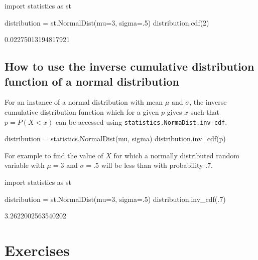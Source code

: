 \begin{pyin}
import statistics as st

distribution = st.NormalDist(mu=3, sigma=.5)
distribution.cdf(2)
\end{pyin}





\begin{raw}
0.02275013194817921
\end{raw}





\subsection{How to use the inverse cumulative distribution function of a normal distribution}
\label{\detokenize{tools-for-mathematics/08-statistics/how/main:how-to-use-the-inverse-cumulative-distribution-function-of-a-normal-distribution}}

For an instance of a normal distribution with mean \(\mu\) and \(\sigma\), the
inverse cumulative distribution function which for a given \(p\) gives \(x\) such that \(p=P(X<x)\)
can be accessed using \texttt{statistics.NormaDist.inv\_cdf}.


\begin{api}
distribution = statistics.NormalDist(mu, sigma)
distribution.inv_cdf(p)
\end{api}



For example to find the value of \(X\) for which a normally distributed random
variable with \(\mu=3\) and \(\sigma=.5\) will be less than with probability \(.7\).




\begin{pyin}
import statistics as st

distribution = st.NormalDist(mu=3, sigma=.5)
distribution.inv_cdf(.7)
\end{pyin}





\begin{raw}
3.2622002563540202
\end{raw}







\section{Exercises}
\label{\detokenize{tools-for-mathematics/08-statistics/exercises/main:exercises}}\label{\detokenize{tools-for-mathematics/08-statistics/exercises/main::doc}}

